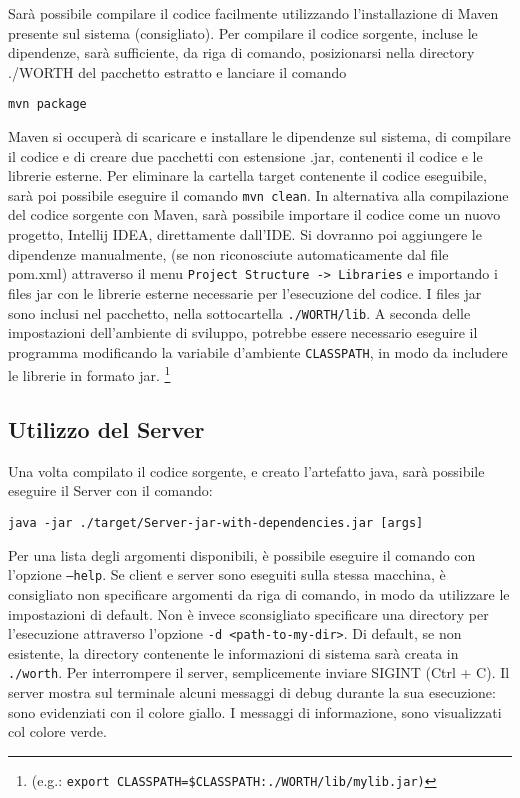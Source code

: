 \documentclass{article}
\begin{document}
Sarà possibile compilare il codice facilmente utilizzando l'installazione di Maven presente sul sistema (consigliato).
Per compilare il codice sorgente, incluse le dipendenze, sarà sufficiente, da riga di comando, posizionarsi nella directory ./WORTH del pacchetto estratto e lanciare il comando 
\begin{center}\texttt{mvn package}\end{center} Maven si occuperà di scaricare e installare le dipendenze sul sistema, di compilare il codice e di creare due pacchetti con estensione .jar, contenenti il codice e le librerie esterne. Per eliminare la cartella target contenente il codice eseguibile, sarà poi possibile eseguire il comando \texttt{mvn clean}.
\newline
In alternativa alla compilazione del codice sorgente con Maven, sarà possibile importare il codice come un nuovo progetto, Intellij IDEA, direttamente dall'IDE. Si dovranno poi aggiungere le dipendenze manualmente, (se non riconosciute automaticamente dal file pom.xml) attraverso il menu \texttt{Project Structure -> Libraries} e importando i files jar con le librerie esterne necessarie per l'esecuzione del codice. I files jar sono inclusi nel pacchetto, nella sottocartella \texttt{./WORTH/lib}. A seconda delle impostazioni dell'ambiente di sviluppo, potrebbe essere necessario eseguire il programma modificando la variabile d'ambiente \texttt{CLASSPATH}, in modo da includere le librerie in formato jar.
\footnote{(e.g.: \texttt{export CLASSPATH=\$CLASSPATH:./WORTH/lib/mylib.jar)}}

\subsection{Utilizzo del Server}

Una volta compilato il codice sorgente, e creato l'artefatto java, sarà possibile eseguire il Server con il comando:
\begin{center}
    \texttt{java -jar ./target/Server-jar-with-dependencies.jar [args]}
\end{center}
Per una lista degli argomenti disponibili, è possibile eseguire il comando con l'opzione \texttt{--help}.
Se client e server sono eseguiti sulla stessa macchina, è consigliato non specificare argomenti da riga di comando, in modo da utilizzare le impostazioni di default. Non è invece sconsigliato specificare una directory per l'esecuzione attraverso l'opzione \texttt{-d <path-to-my-dir>}. Di default, se non esistente, la directory contenente le informazioni di sistema sarà creata in \texttt{./worth}.
Per interrompere il server, semplicemente inviare SIGINT (Ctrl + C). Il server mostra sul terminale alcuni messaggi di debug durante la sua esecuzione: sono evidenziati con il colore giallo. I messaggi di informazione, sono visualizzati col colore verde.
\end{document}
